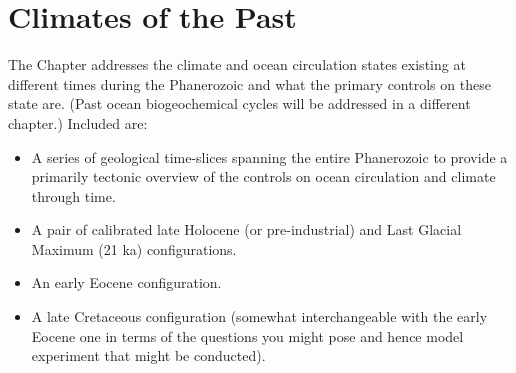 
\cleardoublepage


\chapter{Climates of the Past}\label{ch:paleo-climate}

\hfill \break

\vspace{12mm}

\noindent The Chapter addresses the  climate and ocean circulation states existing at different times during the Phanerozoic and what the primary controls on these state are. (Past ocean biogeochemical cycles will be addressed in a different chapter.) Included are:
\vspace{1mm}

\begin{itemize}
\vspace{1mm}
\item A series of geological time-slices spanning the entire Phanerozoic to provide a primarily tectonic overview of the controls on ocean circulation and climate through time.
\vspace{1mm}
\item A pair of calibrated late Holocene (or pre-industrial) and Last Glacial Maximum (21 ka) configurations.
\vspace{1mm}
\item An early Eocene configuration.
\vspace{1mm}
\item A late Cretaceous configuration (somewhat interchangeable with the early Eocene one in terms of the questions you might pose and hence model experiment that might be conducted).
\end{itemize}

\newpage

